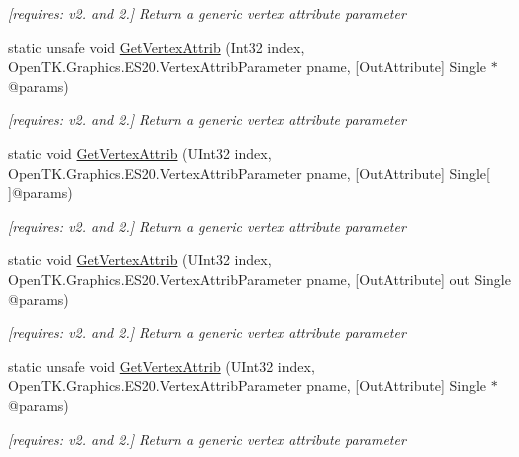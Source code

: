 \begin{DoxyCompactItemize}
\begin{DoxyCompactList}\small\item\em \mbox{[}requires\-: v2. and 2.\mbox{]} Return a generic vertex attribute parameter \end{DoxyCompactList}\item 
static unsafe void \hyperlink{class_open_t_k_1_1_graphics_1_1_e_s20_1_1_g_l_a4ecd6abedd682146c92bd85164111f3c}{Get\-Vertex\-Attrib} (Int32 index, Open\-T\-K.\-Graphics.\-E\-S20.\-Vertex\-Attrib\-Parameter pname, \mbox{[}Out\-Attribute\mbox{]} Single $\ast$@params)
\begin{DoxyCompactList}\small\item\em \mbox{[}requires\-: v2. and 2.\mbox{]} Return a generic vertex attribute parameter \end{DoxyCompactList}\item 
static void \hyperlink{class_open_t_k_1_1_graphics_1_1_e_s20_1_1_g_l_acbc109770d4a0b71f157013bbeff1f35}{Get\-Vertex\-Attrib} (U\-Int32 index, Open\-T\-K.\-Graphics.\-E\-S20.\-Vertex\-Attrib\-Parameter pname, \mbox{[}Out\-Attribute\mbox{]} Single\mbox{[}$\,$\mbox{]}@params)
\begin{DoxyCompactList}\small\item\em \mbox{[}requires\-: v2. and 2.\mbox{]} Return a generic vertex attribute parameter \end{DoxyCompactList}\item 
static void \hyperlink{class_open_t_k_1_1_graphics_1_1_e_s20_1_1_g_l_ad0311445dc9c48d7569fbeb0ecb35a38}{Get\-Vertex\-Attrib} (U\-Int32 index, Open\-T\-K.\-Graphics.\-E\-S20.\-Vertex\-Attrib\-Parameter pname, \mbox{[}Out\-Attribute\mbox{]} out Single @params)
\begin{DoxyCompactList}\small\item\em \mbox{[}requires\-: v2. and 2.\mbox{]} Return a generic vertex attribute parameter \end{DoxyCompactList}\item 
static unsafe void \hyperlink{class_open_t_k_1_1_graphics_1_1_e_s20_1_1_g_l_a6439089ace6bbb822327892428477421}{Get\-Vertex\-Attrib} (U\-Int32 index, Open\-T\-K.\-Graphics.\-E\-S20.\-Vertex\-Attrib\-Parameter pname, \mbox{[}Out\-Attribute\mbox{]} Single $\ast$@params)
\begin{DoxyCompactList}\small\item\em \mbox{[}requires\-: v2. and 2.\mbox{]} Return a generic vertex attribute parameter \end{DoxyCompactList}\item 

\end{DoxyCompactItemize}
